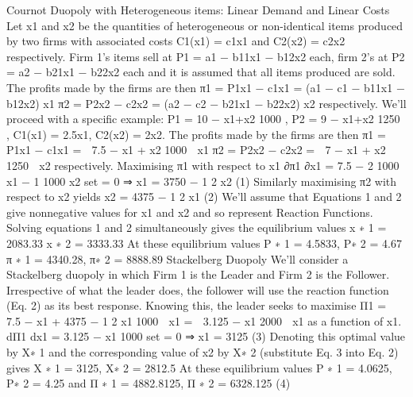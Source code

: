 Cournot Duopoly with Heterogeneous items: Linear Demand and Linear
Costs
Let x1 and x2 be the quantities of heterogeneous or non-identical items produced by two
firms with associated costs C1(x1) = c1x1 and C2(x2) = c2x2 respectively.
Firm 1’s items sell at P1 = a1 − b11x1 − b12x2 each, firm 2’s at P2 = a2 − b21x1 − b22x2
each and it is assumed that all items produced are sold.
The profits made by the firms are then
π1 = P1x1 − c1x1 = (a1 − c1 − b11x1 − b12x2) x1
π2 = P2x2 − c2x2 = (a2 − c2 − b21x1 − b22x2) x2
respectively.
We’ll proceed with a specific example: P1 = 10 −
x1+x2
1000 , P2 = 9 −
x1+x2
1250 , C1(x1) =
2.5x1, C2(x2) = 2x2. The profits made by the firms are then
π1 = P1x1 − c1x1 =

7.5 −
x1 + x2
1000 
x1
π2 = P2x2 − c2x2 =

7 −
x1 + x2
1250 
x2
respectively.
Maximising π1 with respect to x1
∂π1
∂x1
= 7.5 −
2
1000
x1 −
1
1000
x2
set = 0
⇒ x1 = 3750 −
1
2
x2 (1)
Similarly maximising π2 with respect to x2 yields
x2 = 4375 −
1
2
x1 (2)
We’ll assume that Equations 1 and 2 give nonnegative values for x1 and x2 and so represent
Reaction Functions. Solving equations 1 and 2 simultaneously gives the equilibrium values
x
∗
1 = 2083.33
x
∗
2 = 3333.33
At these equilibrium values
P
∗
1 = 4.5833, P∗
2 = 4.67
π
∗
1 = 4340.28, π∗
2 = 8888.89
Stackelberg Duopoly
We’ll consider a Stackelberg duopoly in which Firm 1 is the Leader and Firm 2 is the
Follower. Irrespective of what the leader does, the follower will use the reaction function
(Eq. 2) as its best response.
Knowing this, the leader seeks to maximise
Π1 =

7.5 −
x1 + 4375 −
1
2
x1
1000 
x1 =

3.125 −
x1
2000

x1
as a function of x1.
dΠ1
dx1
= 3.125 −
x1
1000
set = 0
⇒ x1 = 3125 (3)
Denoting this optimal value by X∗
1
and the corresponding value of x2 by X∗
2
(substitute
Eq. 3 into Eq. 2) gives
X
∗
1 = 3125, X∗
2 = 2812.5
At these equilibrium values
P
∗
1 = 4.0625, P∗
2 = 4.25
and
Π
∗
1 = 4882.8125, Π
∗
2 = 6328.125 (4)
